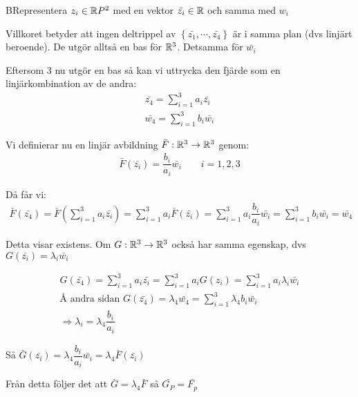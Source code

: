 \begin{prf}
  BRepresentera $z_i\in\mathbb{R} P^2$ med en vektor $\bar{z_i}\in\mathbb{R}$ och samma med $w_i$
  \par\bigskip
  \noindent Villkoret betyder att ingen deltrippel av $\left\{\bar{z_1},\cdots,\bar{z_4}\right\}$ är i samma plan (dvs linjärt beroende). De utgör alltså en bas för $\mathbb{R}^3$. Detsamma för $\bar{w_i}$
  \par\bigskip
  \noindent Eftersom 3 nu utgör en bas så kan vi uttrycka den fjärde som en linjärkombination av de andra:
  \begin{equation*}
    \begin{gathered}
      \bar{z_4} = \sum_{i=1}^{3}a_i\bar{z_i}\\
      \bar{w_4} = \sum_{i=1}^{3}b_i\bar{w_i}
    \end{gathered}
  \end{equation*}
  \par\bigskip
  \noindent Vi definierar nu en linjär avbildning $\bar{F}:\mathbb{R}^3\to\mathbb{R}^3$ genom:
  \begin{equation*}
    \begin{gathered}
      \bar{F}(\bar{z_i}) = \dfrac{b_i}{a_i}\bar{w_i}\qquad i=1,2,3
    \end{gathered}
  \end{equation*}
  \par\bigskip
  \noindent Då får vi:
  \begin{equation*}
    \begin{gathered}
      \bar{F}(\bar{z_4}) = \bar{F}\left(\sum_{i=1}^{3}a_i\bar{z_i}\right) = \sum_{i=1}^{3}a_i\bar{F}(\bar{z_i}) = \sum_{i=1}^{3}a_i\dfrac{b_i}{a_i}\bar{w_i} = \sum_{i=1}^{3}b_i\bar{w_i} = \bar{w_4}
    \end{gathered}
  \end{equation*}
  \par\bigskip
  \noindent Detta visar existens. Om $G:\mathbb{R}^3\to\mathbb{R}^3$ också har samma egenskap, dvs $G(\bar{z_i})=\lambda_i\bar{w_i}$\par
  \begin{equation*}
    \begin{gathered}
      G(\bar{z_4}) = \sum_{i=1}^{3}a_i\bar{z_i} = \sum_{i=1}^{3}a_iG(z_i) = \sum_{i=1}^{3}a_i\lambda_i\bar{w_i}\\
      \text{Å andra sidan } G(\bar{z_4}) = \lambda_4\bar{w_4} = \sum_{i=1}^{3}\lambda_4b_i\bar{w_i}\\
      \Rightarrow \lambda_i = \lambda_4\dfrac{b_i}{a_i}
    \end{gathered}
  \end{equation*}
  \par\bigskip
  \noindent Så $\bar{G}(\bar{z_i}) = \lambda_4\dfrac{b_i}{a_i}\bar{w_i} = \lambda_4\bar{F}(\bar{z_i})$\par
  \noindent Från detta följer det att $\bar{G} = \lambda_4\bar{F}$ så $\bar{G_P} = \bar{F_p}$
\end{prf}
\newpage

